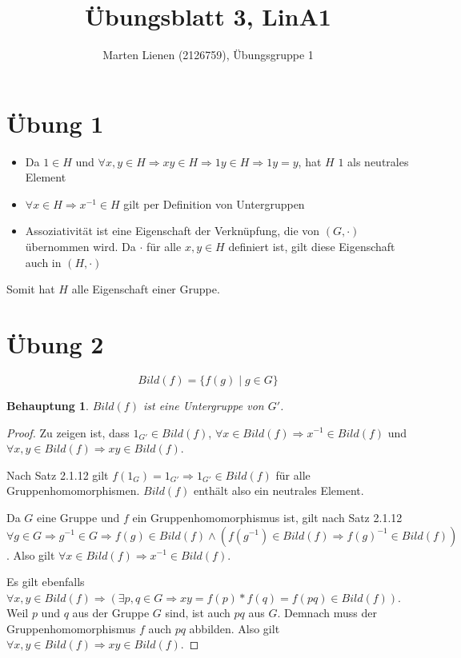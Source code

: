 \documentclass[a4paper,10pt]{article}
\title{Übungsblatt 3, LinA1}
\author{Marten Lienen (2126759), Übungsgruppe 1}
\newtheorem*{claim}{Behauptung}
\begin{document}
\maketitle

\section*{Übung 1}

\begin{itemize}
 \item Da $1 \in H$ und $\forall x, y \in H \Rightarrow xy \in H \Rightarrow 1y \in H \Rightarrow 1y = y$, hat $H$ $1$ als neutrales Element
 \item $\forall x \in H \Rightarrow x^{-1} \in H$ gilt per Definition von Untergruppen
 \item Assoziativität ist eine Eigenschaft der Verknüpfung, die von $(G, \cdot)$ übernommen wird.
 Da $\cdot$ für alle $x, y \in H$ definiert ist, gilt diese Eigenschaft auch in $(H, \cdot)$
\end{itemize}

Somit hat $H$ alle Eigenschaft einer Gruppe.

\section*{Übung 2}

\begin{equation*}
 Bild(f) = \{f(g) \mid g \in G\}
\end{equation*}

\begin{claim}
 $Bild(f)$ ist eine Untergruppe von $G'$.
\end{claim}

\begin{proof}
 Zu zeigen ist, dass $1_{G'} \in Bild(f)$, $\forall x \in Bild(f) \Rightarrow x^{-1} \in Bild(f)$ und $\forall x, y \in Bild(f) \Rightarrow xy \in Bild(f)$.
 
 Nach Satz 2.1.12 gilt $f(1_G) = 1_{G'} \Rightarrow 1_{G'} \in Bild(f)$ für alle Gruppenhomomorphismen.
 $Bild(f)$ enthält also ein neutrales Element.
 
 Da $G$ eine Gruppe und $f$ ein Gruppenhomomorphismus ist, gilt nach Satz 2.1.12 $\forall g \in G \Rightarrow g^{-1} \in G \Rightarrow f(g) \in Bild(f) \land (f(g^{-1}) \in Bild(f) \Rightarrow f(g)^{-1} \in Bild(f))$.
 Also gilt $\forall x \in Bild(f) \Rightarrow x^{-1} \in Bild(f)$.
 
 Es gilt ebenfalls $\forall x, y \in Bild(f) \Rightarrow (\exists p, q \in G \Rightarrow xy = f(p) * f(q) = f(pq) \in Bild(f))$.
 Weil $p$ und $q$ aus der Gruppe $G$ sind, ist auch $pq$ aus $G$.
 Demnach muss der Gruppenhomomorphismus $f$ auch $pq$ abbilden.
 Also gilt $\forall x, y \in Bild(f) \Rightarrow xy \in Bild(f)$.
\end{proof}
\end{document}
